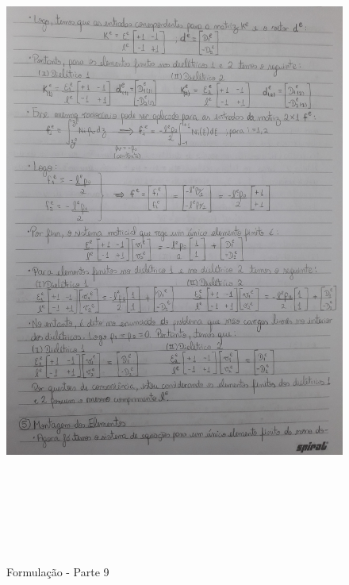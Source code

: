 \documentclass[10pt]{article}
\begin{document}
    \begin{figure}[!htb]
    \centerline{\includegraphics[width=20cm,height=22cm]{Formulação Matemática/Formulacao - Parte 9.jpg}}
    \caption{Formulação - Parte 9}
    \label{fig:fp9}
    \end{figure}
    
\end{document}
